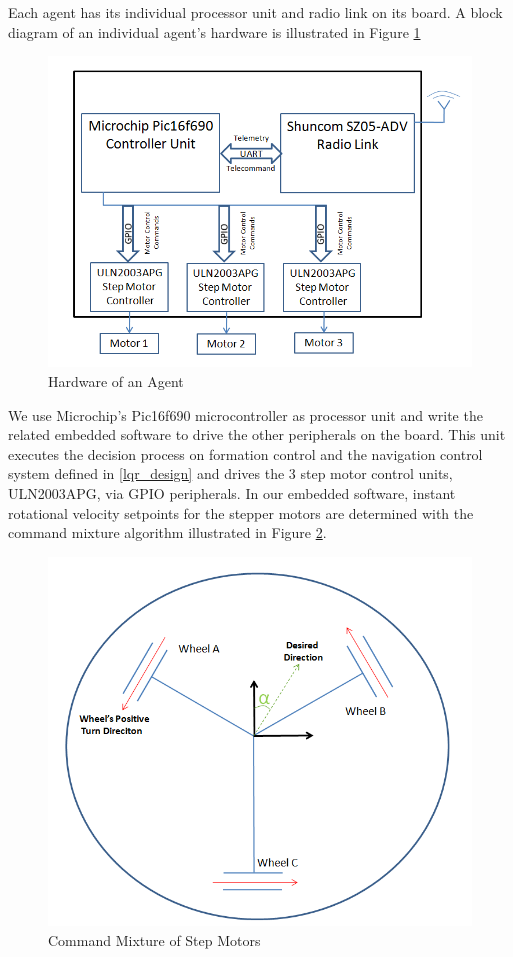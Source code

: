 		
Each agent has its individual processor unit and radio link on its board. A block diagram of an individual agent's hardware is illustrated in Figure \ref{indhardware_ref}
		
\begin{figure}[H]
\caption{Hardware of an Agent} \label{indhardware_ref}
\centerline{\includegraphics[scale = 0.70]{agent}}
\end{figure} 
		
We use Microchip's Pic16f690 microcontroller as processor unit and write the related embedded software to drive the other peripherals on the board. This unit executes the decision process on formation control and the navigation control system defined in \ref{lqr_design} and drives the 3 step motor control units, ULN2003APG, via GPIO peripherals. In our embedded software, instant rotational velocity setpoints for the stepper motors  are determined with the command mixture algorithm illustrated in Figure \ref{ccmb_ref}.
		
\begin{figure}[H]
\caption{Command Mixture of Step Motors} \label{ccmb_ref}
\centerline{\includegraphics[scale = 0.65]{ccmb}}
\end{figure} 

